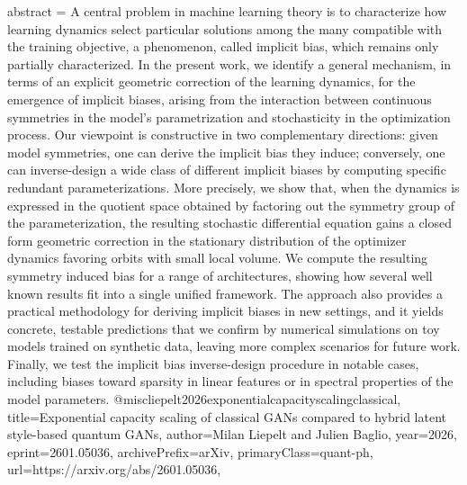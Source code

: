 {      abstract = {A central problem in machine learning theory is to characterize how learning dynamics select particular solutions among the many compatible with the training objective, a phenomenon, called implicit bias, which remains only partially characterized. In the present work, we identify a general mechanism, in terms of an explicit geometric correction of the learning dynamics, for the emergence of implicit biases, arising from the interaction between continuous symmetries in the model's parametrization and stochasticity in the optimization process. Our viewpoint is constructive in two complementary directions: given model symmetries, one can derive the implicit bias they induce; conversely, one can inverse-design a wide class of different implicit biases by computing specific redundant parameterizations. More precisely, we show that, when the dynamics is expressed in the quotient space obtained by factoring out the symmetry group of the parameterization, the resulting stochastic differential equation gains a closed form geometric correction in the stationary distribution of the optimizer dynamics favoring orbits with small local volume. We compute the resulting symmetry induced bias for a range of architectures, showing how several well known results fit into a single unified framework. The approach also provides a practical methodology for deriving implicit biases in new settings, and it yields concrete, testable predictions that we confirm by numerical simulations on toy models trained on synthetic data, leaving more complex scenarios for future work. Finally, we test the implicit bias inverse-design procedure in notable cases, including biases toward sparsity in linear features or in spectral properties of the model parameters.}
}@misc{liepelt2026exponentialcapacityscalingclassical,
      title={Exponential capacity scaling of classical GANs compared to hybrid latent style-based quantum GANs}, 
      author={Milan Liepelt and Julien Baglio},
      year={2026},
      eprint={2601.05036},
      archivePrefix={arXiv},
      primaryClass={quant-ph},
      url={https://arxiv.org/abs/2601.05036},
}
